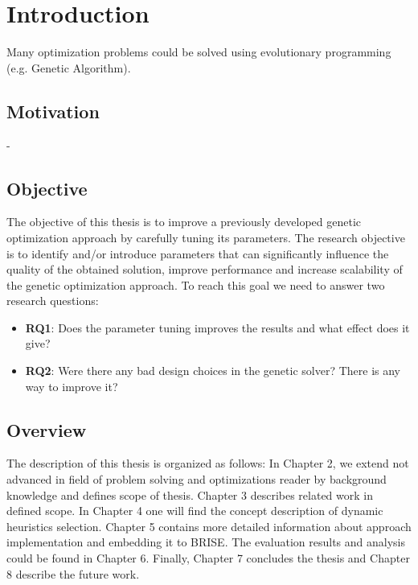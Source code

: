 \chapter{Introduction}\label{intro}
Many optimization problems could be solved using evolutionary programming (e.g. Genetic Algorithm). 

\section{Motivation}
- 


\section{Objective}
The objective of this thesis is to improve a previously developed genetic optimization approach by carefully tuning its parameters. The research objective is to identify and/or introduce parameters that can significantly influence the quality of the obtained solution, improve performance and increase scalability of the genetic optimization approach. To reach this goal we need to answer two research questions:
\begin{itemize}
	\item \textbf{RQ1}: Does the parameter tuning improves the results and what effect does it give?
	\item \textbf{RQ2}: Were there any bad design choices in the genetic solver? There is any way to improve it?
\end{itemize}



  	
\section{Overview}
The description of this thesis is organized as follows: In Chapter 2, we extend not advanced in field of problem solving and optimizations reader by background knowledge and defines scope of thesis. Chapter 3 describes related work in defined scope. In Chapter 4 one will find the concept description of dynamic heuristics selection. Chapter 5 contains more detailed information about approach implementation and  embedding it to BRISE. The evaluation results and analysis could be found in Chapter 6. Finally, Chapter 7 concludes the thesis and Chapter 8 describe the future work.
